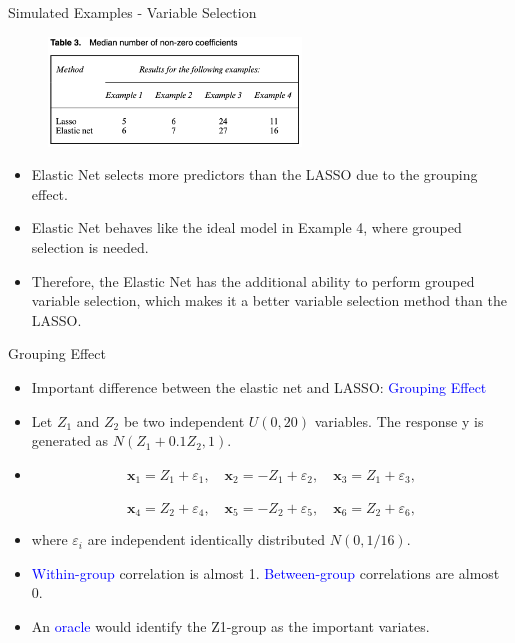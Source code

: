     \begin{frame}{Simulated Examples - Variable Selection}
        \begin{figure}
            \centering
            \includegraphics[width=0.6\textwidth]{img/Table 3.png}
        \end{figure}
        \begin{itemize}
            \item Elastic Net selects more predictors than the LASSO due to the grouping effect. 
            \item Elastic Net behaves like the ideal model in Example 4, where grouped selection is needed.
            \item Therefore, the Elastic Net has the additional ability to perform grouped variable selection, which makes it a better variable selection method than the LASSO.

        \end{itemize}
    \end{frame}

    \begin{frame}{Grouping Effect}
        \begin{itemize}
            \item Important difference between the elastic net and LASSO: \textcolor{blue}{Grouping Effect}
            \item Let $Z_1$ and $Z_2$ be two independent $U(0,20)$ variables. The response y is generated as $N(Z_1+0.1Z_2,1).$
            \item $$\mathbf{x}_1=Z_1+\varepsilon_1,\quad\mathbf{x}_2=-Z_1+\varepsilon_2,\quad\mathbf{x}_3=Z_1+\varepsilon_3,$$
            \\$$\mathbf{x}_4=Z_2+\varepsilon_4,\quad\mathbf{x}_5=-Z_2+\varepsilon_5,\quad\mathbf{x}_6=Z_2+\varepsilon_6,$$
            \item where $\varepsilon_{i}$ are independent identically distributed $N(0,1/16).$
            \item \textcolor{blue}{Within-group} correlation is almost 1. \textcolor{blue}{Between-group} correlations are almost 0.
            \item An \textcolor{blue}{oracle} would identify the Z1-group as the important variates.
        \end{itemize}
    \end{frame}

